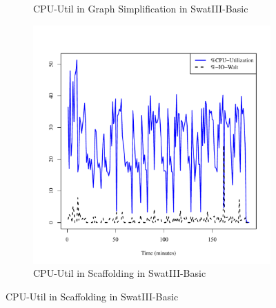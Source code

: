 \documentclass[conference]{IEEEtran}
\begin{document}
\begin{figure}[htb]
\begin{subfigure}[b]{0.3\textwidth}
                \caption{CPU-Util in Graph Simplification in SwatIII-Basic}
                \label{fig:ECCPUHDD}
        \end{subfigure} 
        \begin{subfigure}[b]{0.3\textwidth}
                \includegraphics[width=\textwidth]{Figure/SystemData/Plots/SCFCPUHDD.pdf}
                \caption{CPU-Util in Scaffolding in SwatIII-Basic}
                \label{fig:SCFCPUHDD}
        \end{subfigure}       
        

\end{figure}
\end{document}
